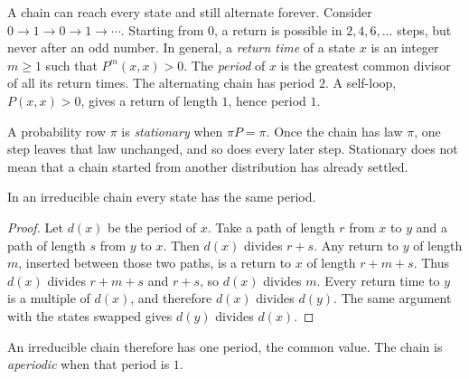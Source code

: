 A chain can reach every state and still alternate forever. Consider $0\to1\to0\to1\to\cdots$. Starting from $0$, a return is possible in $2,4,6,\ldots$ steps, but never after an odd number. In general, a \emph{return time} of a state $x$ is an integer $m\ge1$ such that $P^m(x,x)>0$. The \emph{period} of $x$ is the greatest common divisor of all its return times. The alternating chain has period $2$. A self-loop, $P(x,x)>0$, gives a return of length $1$, hence period $1$.

A probability row $\pi$ is \emph{stationary} when $\pi P=\pi$. Once the chain has law $\pi$, one step leaves that law unchanged, and so does every later step. Stationary does not mean that a chain started from another distribution has already settled.

\begin{lemma}\label{lem:period}
In an irreducible chain every state has the same period.
\end{lemma}
\begin{proof}
Let $d(x)$ be the period of $x$. Take a path of length $r$ from $x$ to $y$ and a path of length $s$ from $y$ to $x$. Then $d(x)$ divides $r+s$. Any return to $y$ of length $m$, inserted between those two paths, is a return to $x$ of length $r+m+s$. Thus $d(x)$ divides $r+m+s$ and $r+s$, so $d(x)$ divides $m$. Every return time to $y$ is a multiple of $d(x)$, and therefore $d(x)$ divides $d(y)$. The same argument with the states swapped gives $d(y)$ divides $d(x)$.
\end{proof}

An irreducible chain therefore has one period, the common value. The chain is \emph{aperiodic} when that period is $1$.

